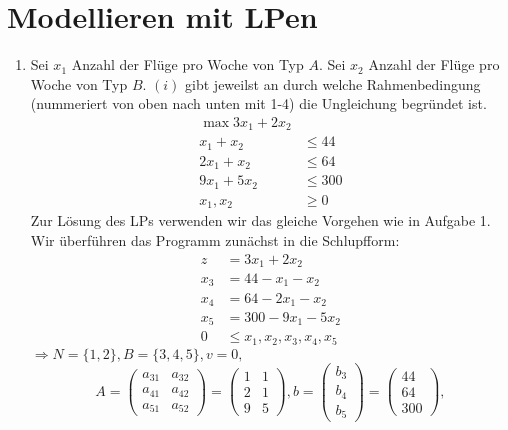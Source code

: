 \documentclass[a4paper,10pt]{article}
\begin{document}
\section{Modellieren mit LPen}
\begin{enumerate}
\item   Sei $x_1$ Anzahl der Flüge pro Woche von Typ $A$. Sei $x_2$ Anzahl der Flüge pro Woche von Typ $B$. $(i)$ gibt jeweilst an durch welche Rahmenbedingung (nummeriert von oben nach unten mit 1-4) die Ungleichung begründet ist.
        \begin{align*}
            \max 3x_1 + 2x_2 &          \tag{4}\\
                x_1 +  x_2 &\leq 44   \tag{1}\\
                2x_1 +  x_2 &\leq 64   \tag{2}\\
                9x_1 + 5x_2 &\leq 300  \tag{3}\\
                x_1,   x_2 &\geq 0
        \end{align*}
        Zur Lösung des LPs verwenden wir das gleiche Vorgehen wie in Aufgabe 1. Wir überführen das Programm zunächst in die Schlupfform:
        \begin{align*}
            z   &=       3x_1 + 2x_2 \\
            x_3 &=  44 -  x_1 -  x_2 \\
            x_4 &=  64 - 2x_1 -  x_2 \\
            x_5 &= 300 - 9x_1 - 5x_2 \\
                0 &\leq x_1, x_2, x_3, x_4, x_5
        \end{align*}
        $\Rightarrow N = \{1,2\}, B = \{3,4,5\}, v = 0,$
        \[
        A = \begin{pmatrix}
                a_{31} & a_{32} \\
                a_{41} & a_{42} \\
                a_{51} & a_{52}
            \end{pmatrix}
        = \begin{pmatrix}
                1 & 1 \\
                2 & 1 \\
                9 & 5
            \end{pmatrix}, 
        b = \begin{pmatrix}b_3 \\ b_4 \\ b_5 \end{pmatrix} 
        = \begin{pmatrix}44 \\ 64 \\ 300\end{pmatrix},
\]
\end{enumerate}
\end{document}
